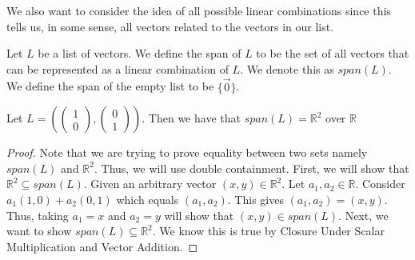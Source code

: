 We also want to consider the idea of all possible linear combinations since this tells us, in some sense, all vectors related to the vectors in our list.
\begin{definition}
    Let $L$ be a list of vectors. We define the span of $L$ to be the set of all vectors that can be represented as a linear combination of $L$. We denote this as $span(L)$. We define the span of the empty list to be $\{\vec{0}\}$.
\end{definition}
\begin{theorem}
    Let $L=\left(\begin{pmatrix}
        1 \\ 0
    \end{pmatrix},\begin{pmatrix}
        0 \\ 1
    \end{pmatrix}\right)$. Then we have that $span(L)=\mathbb{R}^2$ over $\mathbb{R}$
\end{theorem}
\begin{proof}
    Note that we are trying to prove equality between two sets namely $span(L)$ and $\mathbb{R}^2$. Thus, we will use double containment.
    First, we will show that $\mathbb{R}^2\subseteq span(L)$. Given an arbitrary vector $(x,y)\in\mathbb{R}^2$. Let $a_1,a_2\in\mathbb{R}$. Consider $a_1(1,0)+a_2(0,1)$ which equals $(a_1,a_2)$. This gives $(a_1,a_2)=(x,y)$. Thus, taking $a_1=x$ and $a_2=y$ will show that $(x,y)\in span(L)$. Next, we want to show $span(L)\subseteq\mathbb{R}^2$. We know this is true by Closure Under Scalar Multiplication and Vector Addition.
\end{proof}

